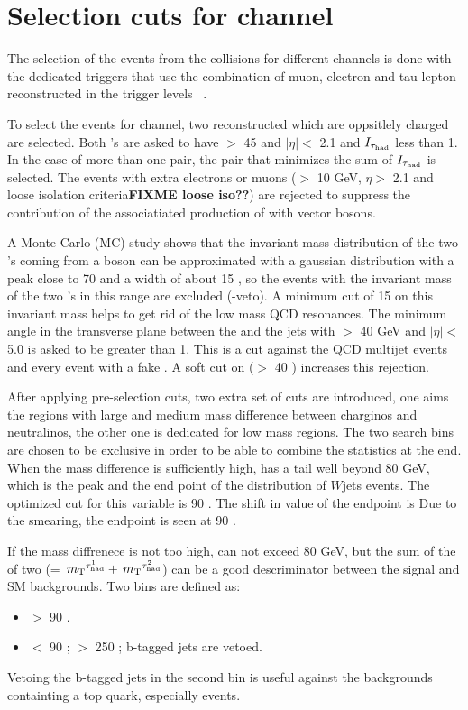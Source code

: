 \section{\texorpdfstring{Selection cuts for \Tau\Tau channel}{Selection cuts for Tau-Tau channel}}
\label{sect:tauTauCuts}
The selection of the events from the collisions for different channels 
is done with the dedicated triggers that use the combination of muon, electron 
and tau lepton reconstructed in the trigger levels ~\cite{CMS:2013hoa,Chatrchyan:2012xi,Chatrchyan:2011nv}.

To select the events for \Tau\Tau channel, two reconstructed \Tau which are oppsitlely charged are selected. Both \Tau's are asked to 
have \PT $>$ 45 \GeV and $|\eta| <$ 2.1 and $I_{\tau_{\rm had}}$ less than 1\GeV. In the case of more than one pair, the pair that minimizes the sum of
$I_{\tau_{\rm had}}$ is selected.
The events with extra electrons or muons (\PT $>$ 10 GeV, $\eta >$ 2.1 and loose isolation criteria{\bf FIXME loose iso??}) 
are rejected to suppress the contribution of the associatiated production of \Z with vector bosons.

A Monte Carlo (MC) study shows that the invariant mass distribution of the two \Tau's coming from a \Z boson can be approximated with a gaussian 
distribution with a peak close to 70 \GeV and a width of about 15 \GeV, so the events with the invariant mass of  
the two \Tau's in this range are excluded (\Z-veto). A minimum cut of 15 \GeV on this invariant mass helps to get rid of the low mass
QCD resonances. The minimum angle in the transverse plane between the \MET and the jets with \PT $>$ 40 GeV and $|\eta| <$ 5.0 
is asked to be greater than 1. This is a cut against the QCD multijet events and every event with a fake \MET. A soft cut on 
\mttwo ($>$ 40 \GeV) increases this rejection.

After applying pre-selection cuts, two extra set of cuts are introduced, one aims the regions with large and medium mass difference between 
charginos and neutralinos, the other one is dedicated for low mass regions. The two search bins are chosen to be exclusive in order 
to be able to combine the statistics at the end. When the mass difference is sufficiently high, \mttwo has a tail well beyond 80 GeV, which is 
the peak  and the end point of the \mt distribution of $W$jets events. The optimized cut for this variable is 90 \GeV. The shift in 
value of the endpoint is Due to the smearing, the endpoint is seen at  90 \GeV.

If the mass diffrenece is not too high, \mttwo can not exceed 80 GeV, 
but the sum of the \mt of two \Tau (\SumMT = $\,{m_{\rm T}}^{\tau_{\rm had}^1} + \,{m_{\rm T}}^{\tau_{\rm had}^2}$) can be a good descriminator between the signal and SM backgrounds. 
Two bins are defined as:
\begin{itemize}
\item[\binone] \mttwo $>$ 90 \GeV.
\item[\bintwo] \mttwo $<$ 90 \GeV; \SumMT $>$ 250 \GeV; b-tagged jets are vetoed.
\end{itemize}
Vetoing the b-tagged jets in the second bin is useful against the backgrounds containting a top quark, especially \ttbar events. 

